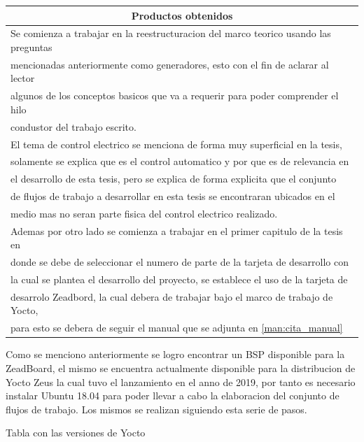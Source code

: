 \documentclass[12pt,letterpaper]{article}
\begin{document}
\begin{table}[h!]
{\begin{tabular}{|l|}
        \hline
        \multicolumn{1}{|c|}{Productos obtenidos} \\ \hline\hline
        Se comienza a trabajar en la reestructuracion del marco teorico usando las preguntas \\
        mencionadas anteriormente como generadores, esto con el fin de aclarar al lector \\
        algunos de los conceptos basicos que va a requerir para poder comprender el hilo \\
        condustor del trabajo escrito.\\

        El tema de control electrico se menciona de forma muy superficial en la tesis,\\
        solamente se explica que es el control automatico y por que es de relevancia en\\
        el desarrollo de esta tesis, pero se explica de forma explicita que el conjunto \\
        de flujos de trabajo a desarrollar en esta tesis se encontraran ubicados en el \\
        medio mas no seran parte fisica del control electrico realizado.\\
        
        Ademas por otro lado se comienza a trabajar en el primer capitulo de la tesis en\\
        donde se debe de seleccionar el numero de parte de la tarjeta de desarrollo con\\
        la cual se plantea el desarrollo del proyecto, se establece el uso de la tarjeta de \\
        desarrolo Zeadbord, la cual debera de trabajar bajo el marco de trabajo de Yocto, \\
        para esto se debera de seguir el manual que se adjunta en \ref{man:cita_manual} \\ \hline \hline  
    \end{tabular}}
\end{table}

Como se menciono anteriormente se logro encontrar un BSP disponible para la ZeadBoard, el mismo
se encuentra actualmente disponible para la distribucion de Yocto Zeus la cual tuvo el lanzamiento 
en el anno de 2019, por tanto es necesario instalar Ubuntu 18.04 para poder llevar a cabo la elaboracion
del conjunto de flujos de trabajo. Los mismos se realizan siguiendo esta serie de pasos. 

Tabla con las versiones de Yocto
\end{document}
